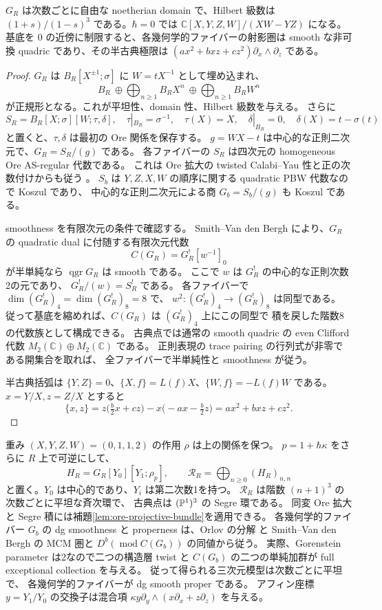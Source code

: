 \begin{proposition}\label{prop:gwa-quadric}
$G_R$ は次数ごとに自由な noetherian domain で、Hilbert 級数は
$(1+s)/(1-s)^3$ である。$\hbar=0$ では
$\mathbb C[X,Y,Z,W]/(XW-YZ)$ になる。
基底を $0$ の近傍に制限すると、各幾何学的ファイバーの射影圏は
smooth な非可換 quadric であり、その半古典極限は
$(a x^2+b xz+c z^2)\partial_x\wedge\partial_z$ である。
\end{proposition}
\begin{proof}
$G_R$ は $B_R[X^{\pm1};\sigma]$ に $W=tX^{-1}$ として埋め込まれ、
\[
 B_R\ \oplus\!\bigoplus_{n\ge1} B_RX^n
       \ \oplus\!\bigoplus_{n\ge1} B_RW^n
\]
が正規形となる。これが平坦性、domain 性、Hilbert 級数を与える。
さらに
\[
 S_R=B_R[X;\sigma][W;\tau,\delta],\quad
 \tau|_{B_R}=\sigma^{-1},\quad\tau(X)=X,\quad
 \delta|_{B_R}=0,\quad\delta(X)=t-\sigma(t)
\]
と置くと、$\tau,\delta$ は最初の Ore 関係を保存する。
$g=WX-t$ は中心的な正則二次元で、$G_R=S_R/(g)$ である。
各ファイバーの $S_R$ は四次元の homogeneous Ore AS-regular 代数である。
これは Ore 拡大の twisted Calabi--Yau 性と正の次数付けからも従う
\cite[定理0.2]{LiuWangWu}。
$S_b$ は $Y,Z,X,W$ の順序に関する quadratic PBW 代数なので Koszul であり、
中心的な正則二次元による商 $G_b=S_b/(g)$ も Koszul である。

smoothness を有限次元の条件で確認する。
Smith--Van den Bergh \cite[補題5.1、命題5.2、定理5.6]{SmithVdB}
により、$G_R$ の quadratic dual に付随する有限次元代数
\[
 C(G_R)=G_R^![w^{-1}]_0
\]
が半単純なら $\operatorname{qgr}G_R$ は smooth である。
ここで $w$ は $G_R^!$ の中心的な正則次数2の元であり、
$G_R^!/(w)=S_R^!$ である。
各ファイバーで $\dim(G_R^!)_4=\dim(G_R^!)_8=8$ で、
$w^2:(G_R^!)_4\to(G_R^!)_8$ は同型である。
従って基底を縮めれば、$C(G_R)$ は $(G_R^!)_4$ 上にこの同型で
積を戻した階数8の代数族として構成できる。
古典点では通常の smooth quadric の even Clifford 代数
$M_2(\mathbb C)\oplus M_2(\mathbb C)$ である。
正則表現の trace pairing の行列式が非零である開集合を取れば、
全ファイバーで半単純性と smoothness が従う。

半古典括弧は
$\{Y,Z\}=0$、$\{X,f\}=L(f)X$、$\{W,f\}=-L(f)W$ である。
$x=Y/X,z=Z/X$ とすると
\[
 \{x,z\}=z\bigl(\tfrac b2x+cz\bigr)
             -x\bigl(-ax-\tfrac b2z\bigr)
          =ax^2+bxz+cz^2.
\]
\end{proof}

重み $(X,Y,Z,W)=(0,1,1,2)$ の作用 $\rho$ は上の関係を保つ。
$p=1+\hbar\kappa$ をさらに $R$ 上で可逆にして、
\[
 H_R=G_R[Y_0][Y_1;\rho_p],\qquad
 \mathcal R_R=\bigoplus_{n\ge0}(H_R)_{n,n}
\]
と置く。$Y_0$ は中心的であり、$Y_i$ は第二次数1を持つ。
$\mathcal R_R$ は階数 $(n+1)^3$ の次数ごとに平坦な斉次環で、
古典点は $(\mathbb P^1)^3$ の Segre 環である。
同変 Ore 拡大と Segre 積には補題\ref{lem:ore-projective-bundle}を適用できる。
各幾何学的ファイバー $G_b$ の dg smoothness と properness は、Orlov の分解
\cite[定理2.5]{OrlovSing} と Smith--Van den Bergh の
MCM 圏と $D^b(\operatorname{mod}C(G_b))$ の同値から従う。
実際、Gorenstein parameter は2なので二つの構造層 twist と
$C(G_b)$ の二つの単純加群が full exceptional collection を与える。
従って得られる三次元模型は次数ごとに平坦で、
各幾何学的ファイバーが dg smooth proper である。
アフィン座標 $y=Y_1/Y_0$ の交換子は混合項
$\kappa y\partial_y\wedge(x\partial_x+z\partial_z)$ を与える。

